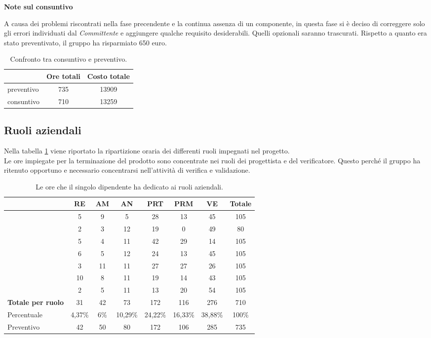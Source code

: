 {{{		\textbf{Note sul consuntivo}{
	A causa dei problemi riscontrati nella fase precendente e la continua assenza di un componente, in questa fase si è deciso di correggere solo gli errori individuati dal \textit{Committente} e aggiungere qualche requisito desiderabili. Quelli opzionali saranno trascurati. 
	Rispetto a quanto era stato preventivato, il gruppo ha risparmiato 650 euro.
		\begin{table}[h!]
		\begin{center}
			\begin{tabular}{l c c}				
				\toprule
					&Ore totali& Costo totale \\ 
				\midrule
				preventivo	&	735	& 13909\\ 
				consuntivo	&	710	& 13259\\
				\bottomrule
			\end{tabular}	
		\caption{Confronto tra consuntivo e preventivo.}
		\end{center}
	\end{table}
	}
	}
	
	\newpage
	\subsection{Ruoli aziendali}{
	Nella tabella \ref{fig: ruoli} viene riportato la ripartizione oraria dei differenti ruoli impegnati nel progetto.\\
	Le ore impiegate per la terminazione del prodotto sono concentrate nei ruoli dei progettista e del verificatore. Questo perché il gruppo ha ritenuto opportuno e necessario concentrarsi nell'attività di verifica e validazione.
	
	\begin{table}[h!]
		\begin{center}
			\begin{tabular}{l c c c c c c c}				
				\toprule
				&	RE& AM& AN& PRT& PRM& VE& Totale \\ 
				\midrule
				\BM	&	5	&	9	&	5	&	28	&	13	&	45	&	105\\ 
				\BA	&	2	&	3	&	12	&	19	&	0	&	49 	&	80\\
				\CD	&	5	&	4	&	11	&	42	&	29	&	14 	&	105\\ 
				\LS	&	6	&	5	&	12	&	24	&	13	&	45  &	105\\
				\PV &	3	&	11	&	11	&	27	&	27	&	26  &	105\\
				\ZF 	&	10	&	8	&	11	&	19	&	14	&	43  &	105\\	
				\ZE &	2	&	5	&	11	&	13	&	20	&	54	&	105\\ \hline
				\textbf{Totale per ruolo}&	 31 &	42 &	73	&	172 &	116 & 276 & 710\\ \hline
				Percentuale	&	4,37\% & 6\% & 10,29\% & 24,22\% & 16,33\% &  38,88\% & 100\%\\ 
				Preventivo & 42 & 50 & 80  & 172 & 106 & 285 & 735\\
				\bottomrule
			\end{tabular}	
		\caption{Le ore che il singolo dipendente ha dedicato ai ruoli aziendali.} \label{fig: ruoli}
		\end{center}
	\end{table}
	
}}}
